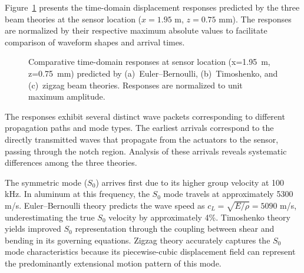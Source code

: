 \documentclass[12pt,a4paper]{report}
\begin{document}
Figure~\ref{fig:theory_comparison_responses} presents the time-domain displacement responses predicted by the three beam theories at the sensor location ($x = 1.95$ m, $z = 0.75$ mm). The responses are normalized by their respective maximum absolute values to facilitate comparison of waveform shapes and arrival times.

\begin{figure}[H]
\centering
{}
\caption{Comparative time-domain responses at sensor location (x=1.95~m, z=0.75~mm) predicted by (a)~Euler--Bernoulli, (b)~Timoshenko, and (c)~zigzag beam theories. Responses are normalized to unit maximum amplitude.}
\label{fig:theory_comparison_responses}
\end{figure}

The responses exhibit several distinct wave packets corresponding to different propagation paths and mode types. The earliest arrivals correspond to the directly transmitted waves that propagate from the actuators to the sensor, passing through the notch region. Analysis of these arrivals reveals systematic differences among the three theories.

The symmetric mode ($S_0$) arrives first due to its higher group velocity at 100 kHz. In aluminum at this frequency, the $S_0$ mode travels at approximately 5300 m/s. Euler--Bernoulli theory predicts the wave speed as $c_L = \sqrt{E/\rho} = 5090$ m/s, underestimating the true $S_0$ velocity by approximately 4\%. Timoshenko theory yields improved $S_0$ representation through the coupling between shear and bending in its governing equations. Zigzag theory accurately captures the $S_0$ mode characteristics because its piecewise-cubic displacement field can represent the predominantly extensional motion pattern of this mode.
\end{document}
